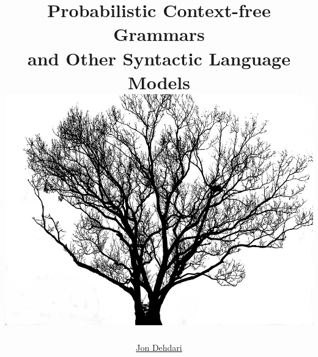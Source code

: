 \documentclass[xcolor=pdftex,x11names,table,hyperref]{beamer}
\begin{document}
\title{Probabilistic Context-free Grammars \\and Other Syntactic Language Models \\[1.5em]
 \includegraphics[height=0.35\textheight,angle=180]{images/tree-169250_960_720.jpg} \\[-1.0em]
 }
\author{\href{http://jon.dehdari.org}{Jon Dehdari}}
\frame{\titlepage}
\end{document}
